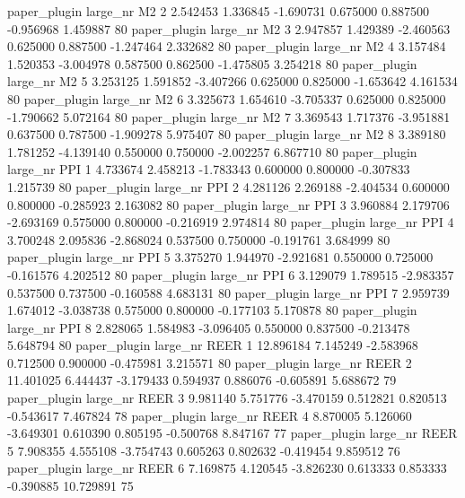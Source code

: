 paper_plugin   large_nr       M2                 2  2.542453  1.336845  -1.690731 0.675000 0.887500 -0.956968    1.459887 80
paper_plugin   large_nr       M2                 3  2.947857  1.429389  -2.460563 0.625000 0.887500 -1.247464    2.332682 80
paper_plugin   large_nr       M2                 4  3.157484  1.520353  -3.004978 0.587500 0.862500 -1.475805    3.254218 80
paper_plugin   large_nr       M2                 5  3.253125  1.591852  -3.407266 0.625000 0.825000 -1.653642    4.161534 80
paper_plugin   large_nr       M2                 6  3.325673  1.654610  -3.705337 0.625000 0.825000 -1.790662    5.072164 80
paper_plugin   large_nr       M2                 7  3.369543  1.717376  -3.951881 0.637500 0.787500 -1.909278    5.975407 80
paper_plugin   large_nr       M2                 8  3.389180  1.781252  -4.139140 0.550000 0.750000 -2.002257    6.867710 80
paper_plugin   large_nr      PPI                 1  4.733674  2.458213  -1.783343 0.600000 0.800000 -0.307833    1.215739 80
paper_plugin   large_nr      PPI                 2  4.281126  2.269188  -2.404534 0.600000 0.800000 -0.285923    2.163082 80
paper_plugin   large_nr      PPI                 3  3.960884  2.179706  -2.693169 0.575000 0.800000 -0.216919    2.974814 80
paper_plugin   large_nr      PPI                 4  3.700248  2.095836  -2.868024 0.537500 0.750000 -0.191761    3.684999 80
paper_plugin   large_nr      PPI                 5  3.375270  1.944970  -2.921681 0.550000 0.725000 -0.161576    4.202512 80
paper_plugin   large_nr      PPI                 6  3.129079  1.789515  -2.983357 0.537500 0.737500 -0.160588    4.683131 80
paper_plugin   large_nr      PPI                 7  2.959739  1.674012  -3.038738 0.575000 0.800000 -0.177103    5.170878 80
paper_plugin   large_nr      PPI                 8  2.828065  1.584983  -3.096405 0.550000 0.837500 -0.213478    5.648794 80
paper_plugin   large_nr     REER                 1 12.896184  7.145249  -2.583968 0.712500 0.900000 -0.475981    3.215571 80
paper_plugin   large_nr     REER                 2 11.401025  6.444437  -3.179433 0.594937 0.886076 -0.605891    5.688672 79
paper_plugin   large_nr     REER                 3  9.981140  5.751776  -3.470159 0.512821 0.820513 -0.543617    7.467824 78
paper_plugin   large_nr     REER                 4  8.870005  5.126060  -3.649301 0.610390 0.805195 -0.500768    8.847167 77
paper_plugin   large_nr     REER                 5  7.908355  4.555108  -3.754743 0.605263 0.802632 -0.419454    9.859512 76
paper_plugin   large_nr     REER                 6  7.169875  4.120545  -3.826230 0.613333 0.853333 -0.390885   10.729891 75
